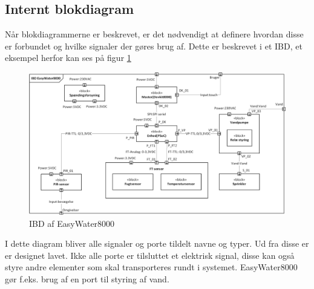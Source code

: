 \subsection{Internt blokdiagram}
Når blokdiagrammerne er beskrevet, er det nødvendigt at definere hvordan disse er forbundet og hvilke signaler der gøres brug af. Dette er beskrevet i et IBD, et eksempel herfor kan ses på figur \ref{lab:IBD}

\begin{figure}[H]
  \centering
    \includegraphics[width=\textwidth]{Billeder/IBD}
    \caption{IBD af EasyWater8000}
    \label{lab:IBD}
\end{figure}

I dette diagram bliver alle signaler og porte tildelt navne og typer. Ud fra disse er er designet lavet. Ikke alle porte er tilsluttet et elektrisk signal, disse kan også styre andre elementer som skal transporteres rundt i systemet. EasyWater8000 gør f.eks. brug af en port til styring af vand.